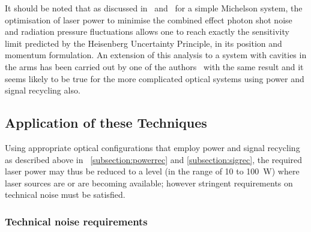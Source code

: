 \documentclass{article}
\begin{document}
It should be noted that as discussed in~\cite{Edelstein, Caves1,
Caves2} and~\cite{Loudon} for a simple Michelson system,
the optimisation of laser power to minimise the combined effect photon
shot noise and radiation pressure fluctuations allows one to reach
exactly the sensitivity limit predicted by the Heisenberg Uncertainty
Principle, in its position and momentum formulation. An extension of
this analysis to a system with cavities in the arms has been carried
out by one of the authors~\cite{Houghprivcomm} with the same result
and it seems likely to be true for the more complicated optical
systems using power and signal recycling also.



\subsection{Application of these Techniques}
\label{subsection:application}

Using appropriate optical configurations that employ power and signal
recycling as described above in ~\ref{subsection:powerrec} and
\ref{subsection:sigrec}, the required laser power may thus be reduced
to a level (in the range of 10 to 100~W) where laser sources are or
are becoming available; however stringent requirements on technical
noise must be satisfied.




\subsubsection{Technical noise requirements}
\label{subsubsection:lasernoise}
\end{document}
